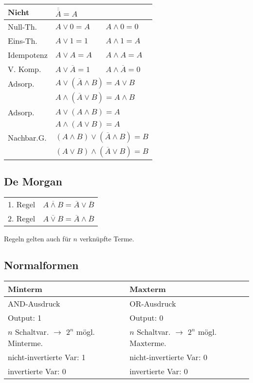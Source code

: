 \begin{flushleft}
    \renewcommand{\arraystretch}{1.5}
    \begin{tabular}{l l l}
        Nicht & $\overline{\overline{A}} = A$ & \\
        \hline
        Null-Th. & $A \lor 0 = A$ & $A \land 0 = 0$\\
        \hline
        Eins-Th. & $A \lor 1 = 1$ & $A \land 1 = A$\\
        \hline
        Idempotenz & $A \lor A = A$ & $A \land A = A$\\
        \hline
        V. Komp. & $A \lor \overline{A} = 1$ & $A \land \overline{A} = 0$\\
        \hline
        Adsorp. & \multicolumn{2}{l}{$A \lor (\overline{A} \land B) = A \lor B$}\\
        & \multicolumn{2}{l}{$A \land (\overline{A} \lor B) = A \land B$}\\
        \hline
        Adsorp. & \multicolumn{2}{l}{$A \lor (A \land B) = A$}\\
        & \multicolumn{2}{l}{$A \land (A \lor B) = A$}\\
        \hline
        Nachbar.G. & \multicolumn{2}{l}{$(A \land B) \lor (\overline{A} \land B) = B$}\\
        & \multicolumn{2}{l}{$(A \lor B) \land (\overline{A} \lor B) = B$}
    \end{tabular}
\end{flushleft}

\subsection{De Morgan}
\begin{flushleft}
    \renewcommand{\arraystretch}{1.5}
    \begin{tabular}{l l}
        1. Regel & $\overline{A \land B} = \overline{A} \lor \overline{B}$\\
        2. Regel & $\overline{A \lor B} = \overline{A} \land \overline{B}$\\
    \end{tabular}
\end{flushleft}
Regeln gelten auch für $n$ verknüpfte Terme.

\subsection{Normalformen}
\begin{center}
    \renewcommand{\arraystretch}{1.5}
    \begin{tabular}{p{30mm} | p{30mm}}
        \textbf{Minterm} & \textbf{Maxterm}\\
        \hline
        AND-Ausdruck & OR-Ausdruck\\
        Output: 1 & Output: 0\\ 
        $n$ Schaltvar. $\rightarrow$ $2^n$ mögl. Minterme. & $n$ Schaltvar. $\rightarrow$ $2^n$ mögl. Maxterme.\\
        nicht-invertierte Var: 1 & nicht-invertierte Var: 0\\
        invertierte Var: 0 &invertierte Var: 0
    \end{tabular}
\end{center}
